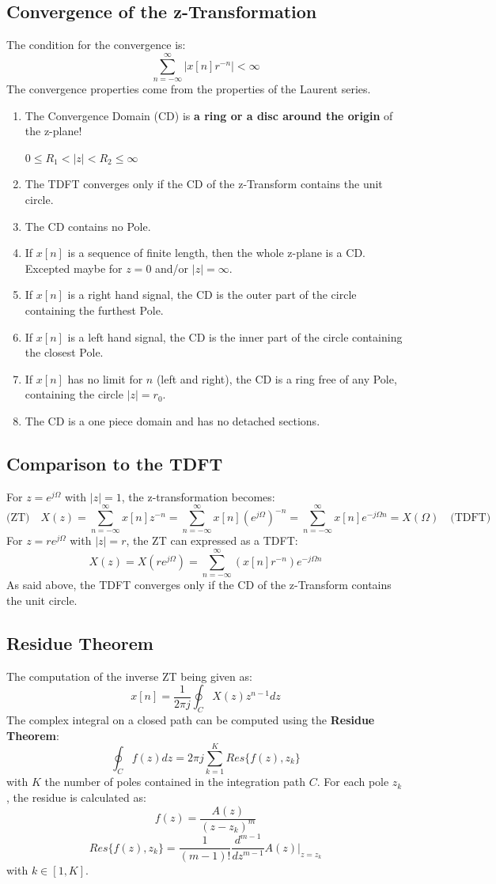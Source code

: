 \documentclass[10pt,a4paper]{article}
\begin{document}
\subsection{Convergence of the z-Transformation}
The condition for the convergence is:
$$
\sum_{n=-\infty}^{\infty} \vert x[n]r^{-n} \vert < \infty
$$
The convergence properties come from the properties of the Laurent series. 
\begin{enumerate}
\item The Convergence Domain (CD) is \textbf{a ring or a disc around the origin} of the z-plane!

$0 \leq R_1 < \vert z \vert < R_2 \leq \infty$
\item The TDFT converges only if the CD of the z-Transform contains the unit circle. 
\item The CD contains no Pole.
\item If $x[n]$ is a sequence of finite length, then the whole z-plane is a CD. Excepted maybe for $z = 0$ and/or $\vert z \vert = \infty$.
\item If $x[n]$ is a right hand signal, the CD is the outer part of the circle containing the furthest Pole. 
\item If $x[n]$ is a left hand signal, the CD is the inner part of the circle containing the closest Pole. 
\item If $x[n]$ has no limit for $n$ (left and right), the CD is a ring free of any Pole, containing the circle $\vert z \vert = r_0$.
\item The CD is a one piece domain and has no detached sections. 
\end{enumerate}

\subsection{Comparison to the TDFT}
For $z = e^{j\Omega}$ with $\vert z \vert = 1$, the z-transformation becomes:
$$
\text{(ZT)} \quad
X(z) = \sum_{n=-\infty}^{\infty} x[n] z^{-n}
	 = \sum_{n=-\infty}^{\infty} x[n] (e^{j\Omega})^{-n} 
	 = \sum_{n=-\infty}^{\infty} x[n] e^{-j\Omega n} 
	 = X(\Omega) \quad \text{(TDFT)}
$$
For $z = re^{j\Omega}$ with $\vert z \vert = r$, the ZT can expressed as a TDFT:
$$
X(z) = X(re^{j\Omega}) = \sum_{n=-\infty}^{\infty} (x[n]r^{-n}) e^{-j\Omega n}
$$
As said above, the TDFT converges only if the CD of the z-Transform contains the unit circle.

\subsection{Residue Theorem}
The computation of the inverse ZT being given as:
$$
x[n] = \frac{1}{2\pi j} \oint_C X(z)z^{n-1} dz
$$
The complex integral on a closed path can be computed using the \textbf{Residue Theorem}:
$$
\boxed{
\oint_C f(z)dz = 2\pi j \sum_{k=1}^K Res\{f(z),z_k\}
}
$$
with $K$ the number of poles contained in the integration path $C$. For each pole $z_k$, the residue is calculated as:
$$
f(z) = \frac{A(z)}{(z-z_k)^m}
$$
$$
\boxed{
Res\{f(z),z_k\} = \frac{1}{(m-1)!} \frac{d^{m-1}}{dz^{m-1}} A(z) \vert_{z = z_k}
}
$$
with $k \in [1,K]$.
\end{document}
